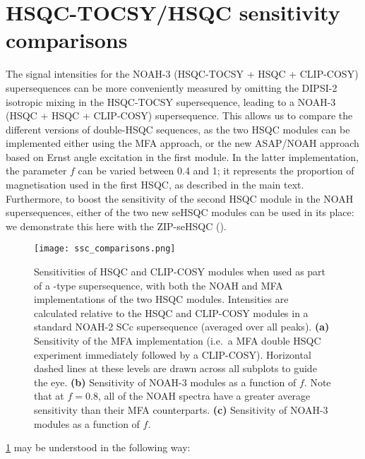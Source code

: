 \section{HSQC-TOCSY/HSQC sensitivity comparisons}

The signal intensities for the NOAH-3  (HSQC-TOCSY + HSQC + CLIP-COSY) supersequences can be more conveniently measured by omitting the DIPSI-2 isotropic mixing in the HSQC-TOCSY supersequence, leading to a NOAH-3  (HSQC + HSQC + CLIP-COSY) supersequence.
This allows us to compare the different versions of double-HSQC sequences, as the two HSQC modules can be implemented either using the MFA approach, or the new ASAP/NOAH approach based on Ernst angle excitation in the first module.
In the latter implementation, the parameter $f$ can be varied between 0.4 and 1; it represents the proportion of  magnetisation used in the first HSQC, as described in the main text.
Furthermore, to boost the sensitivity of the second HSQC module in the NOAH supersequences, either of the two new seHSQC modules can be used in its place: we demonstrate this here with the ZIP-seHSQC (\noahSpb{}).

\begin{figure}
    \centering
    \texttt{[image: ssc\_comparisons.png]}
    \caption{
        Sensitivities of HSQC and CLIP-COSY modules when used as part of a -type supersequence, with both the NOAH and MFA implementations of the two HSQC modules.
        Intensities are calculated relative to the HSQC and CLIP-COSY modules in a standard NOAH-2 SCc supersequence (averaged over all peaks).
        \textbf{(a)} Sensitivity of the MFA implementation (i.e.\ a MFA double HSQC experiment immediately followed by a CLIP-COSY).
        Horizontal dashed lines at these levels are drawn across all subplots to guide the eye.
        \textbf{(b)} Sensitivity of NOAH-3  modules as a function of $f$.
        Note that at $f = 0.8$, all of the NOAH spectra have a greater average sensitivity than their MFA counterparts.
        \textbf{(c)} Sensitivity of NOAH-3  modules as a function of $f$.
        \andro{}
    }
    \label{fig:ssc_comparisons}
\end{figure}

\cref{fig:ssc_comparisons} may be understood in the following way:


